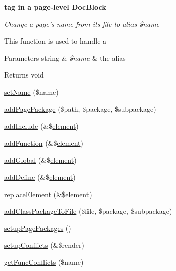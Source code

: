 \begin{Indent}{\bf tag in a page-\/level \-Doc\-Block}\par
{\em \-Change a page's name from its file to alias \$name

\-This function is used to handle a


\begin{DoxyParams}[1]{\-Parameters}
string & {\em \$name} & the alias\\
\hline
\end{DoxyParams}
\begin{DoxyReturn}{\-Returns}
void 
\end{DoxyReturn}
}\begin{DoxyCompactItemize}
\item 
\hyperlink{class_procedural_pages_a2fe666694997d047711d7653eca2f132}{set\-Name} (\$name)
\item 
\hyperlink{class_procedural_pages_afe9c7e784829b57387a18176aaf00b57}{add\-Page\-Package} (\$path, \$package, \$subpackage)
\item 
\hyperlink{class_procedural_pages_a0429a1283d8a6c813bcd9375ae7836f3}{add\-Include} (\&\$\hyperlink{bug-904820_8php_aa94081298ab2dfd0f261cce6c203d9aa}{element})
\item 
\hyperlink{class_procedural_pages_a6e0903db9de3640f6294de2bf3122785}{add\-Function} (\&\$\hyperlink{bug-904820_8php_aa94081298ab2dfd0f261cce6c203d9aa}{element})
\item 
\hyperlink{class_procedural_pages_ad9ed3b5f42a738bddb68641ca171c3f7}{add\-Global} (\&\$\hyperlink{bug-904820_8php_aa94081298ab2dfd0f261cce6c203d9aa}{element})
\item 
\hyperlink{class_procedural_pages_af7152fb397a44e345ffb07b76b1acb8c}{add\-Define} (\&\$\hyperlink{bug-904820_8php_aa94081298ab2dfd0f261cce6c203d9aa}{element})
\item 
\hyperlink{class_procedural_pages_a1eef1c3fb2b3b99ee675f9bdbd3e8035}{replace\-Element} (\&\$\hyperlink{bug-904820_8php_aa94081298ab2dfd0f261cce6c203d9aa}{element})
\item 
\hyperlink{class_procedural_pages_a6ff568b4ade0aae11e8e7c77c715e261}{add\-Class\-Package\-To\-File} (\$file, \$package, \$subpackage)
\item 
\hyperlink{class_procedural_pages_a06cde077f326b9c48b6af70fc9a90b88}{setup\-Page\-Packages} ()
\item 
\hyperlink{class_procedural_pages_a1e4d10c5fcc9f7cedad51865228f6de8}{setup\-Conflicts} (\&\$render)
\item 
\hyperlink{class_procedural_pages_abd7e3fe93a120d8c86f7e9c9aa98e67e}{get\-Func\-Conflicts} (\$name)

\end{DoxyCompactItemize}
\end{Indent}
